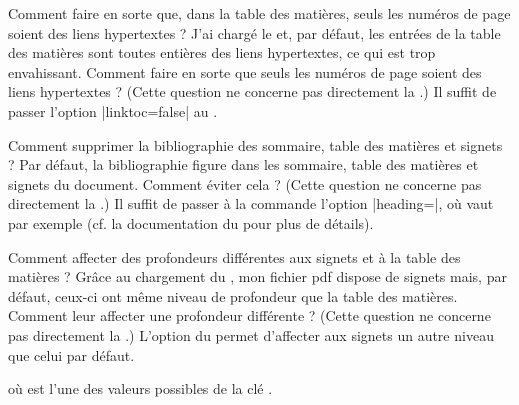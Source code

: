 \begin{dbfaq}{Comment faire en sorte que, dans la table des matières, seuls
    les numéros de page soient des liens hypertextes ?}{}
  J'ai chargé le  et, par défaut, les entrées de la table des
  matières sont toutes entières des liens hypertextes, ce qui est trop
  envahissant. Comment faire en sorte que seuls les numéros de page soient des
  liens hypertextes ?
  \tcblower
  (Cette question ne concerne pas directement la \yatCl{}.) Il suffit de passer
  l'option |linktoc=false| au .
\end{dbfaq}

\begin{dbfaq}{Comment supprimer la bibliographie des sommaire, table des
    matières et signets ?}{}
  Par défaut, la bibliographie figure dans les sommaire, table des matières et
  signets du document. Comment éviter cela ?
  \tcblower
  (Cette question ne concerne pas directement la \yatCl{}.) Il suffit de passer
  à la commande  l'option
  |heading=|, où  vaut par exemple
   (cf. la documentation du  pour plus
  de détails).
\end{dbfaq}

\begin{dbfaq}{Comment affecter des profondeurs différentes aux signets et à la
    table des matières ?}{}
  Grâce au chargement du , mon fichier \acrshort{pdf} dispose
  de signets mais, par défaut, ceux-ci ont même niveau de profondeur que la
  table des matières. Comment leur affecter une profondeur différente ?
  \tcblower
  (Cette question ne concerne pas directement la \yatCl{}.) L'option
   du  permet d'affecter aux signets un
  autre niveau que celui par défaut.
\begin{preamblecode}[title=Par exemple dans le \File{\configurationfile}]
\end{preamblecode}
où  est l'une des valeurs possibles de la clé
.
\end{dbfaq}


